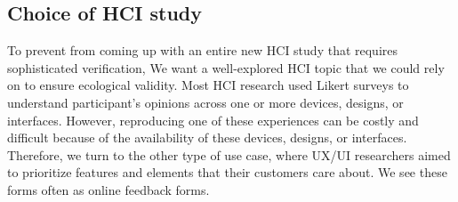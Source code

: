 



\subsection{Choice of HCI study}
To prevent from coming up with an entire new HCI study that requires sophisticated verification,
We want a well-explored HCI topic that we could rely on to ensure ecological validity.
Most HCI research used Likert surveys to understand participant's opinions across one or more devices, designs, or interfaces.
However, reproducing one of these experiences can be costly and difficult because of the availability of these devices, designs, or interfaces.
Therefore, we turn to the other type of use case, where UX/UI researchers aimed to prioritize features and elements that their customers care about.
We see these forms often as online feedback forms.

